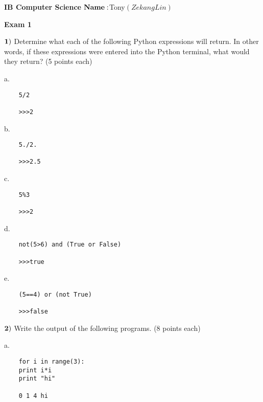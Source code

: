 \documentclass{article}
\begin{document}
	
	\doublespacing
	\textbf{IB Computer Science }                        %
	\hfill                             %
	$ {\bf Name: } $Tony$(Zekang Lin)
	$
	\begin{centering}
		\vspace{1cm}
		\textbf{Exam 1}\\
	\end{centering}
	\vspace{1cm}
	
	$\bf{1)}$ Determine what each of the following Python expressions will return.  In other words, if these expressions were entered into the Python terminal, what would they return?
	(5 points each)
	
	\vspace{1cm}
	
	a.  
	\begin{verbatim}
	5/2
	
	>>>2
	\end{verbatim}
	
	
	b.   \begin{verbatim}
	5./2.
	
	>>>2.5
	\end{verbatim}
	\vspace{1cm}
	
	c.  
	\begin{verbatim}
	5%3
	
	>>>2
	\end{verbatim}
	\vspace{1cm}
	
	d. 
	\begin{verbatim}
	not(5>6) and (True or False) 
	
	>>>true
	\end{verbatim}
	\vspace{1cm}
	
	e. 
	\begin{verbatim}
	(5==4) or (not True) 
	
	>>>false
	\end{verbatim}
	\vspace{1cm}
	
	\newpage
	
	$\bf{2)}$ Write the output of the following programs. (8 points each)
	
	\vspace{1cm}
	
	
	a.   \begin{verbatim}
	for i in range(3):
	print i*i
	print "hi"
	
	0 1 4 hi
	\end{verbatim}
	\vspace{1cm}
	
\end{document}

